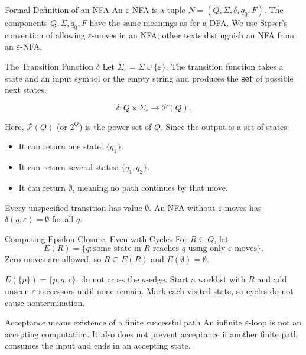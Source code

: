 \documentclass[10pt]{beamer}
\begin{document}
\begin{frame}{Formal Definition of an NFA}
  \small
  An $\varepsilon$-NFA is a tuple $N=(Q,\Sigma,\delta,q_0,F)$.
  The components $Q,\Sigma,q_0,F$ have the same meanings as for a DFA.
  We use Sipser's convention of allowing $\varepsilon$-moves in an NFA;
  other texts distinguish an NFA from an $\varepsilon$-NFA.
  \pause
  \begin{block}{The Transition Function $\delta$}
    Let $\Sigma_\varepsilon = \Sigma \cup \{\varepsilon\}$.
    The transition function takes a state and an input symbol or the empty string and produces the \textbf{set} of possible next states.
    
    \[
      \delta:Q\times\Sigma_\varepsilon\longrightarrow\mathcal{P}(Q).
    \]
  \end{block}
  \pause
  \vspace{0.3cm}
  Here, $\mathcal{P}(Q)$ (or $2^Q$) is the power set of $Q$. Since the output is a set of states:
  \begin{itemize}
      \item It can return one state: $\{q_1\}$.
      \item It can return several states: $\{q_1,q_2\}$.
      \item It can return $\emptyset$, meaning no path continues by that move.
  \end{itemize}
  Every unspecified transition has value $\emptyset$. An NFA without
  $\varepsilon$-moves has $\delta(q,\varepsilon)=\emptyset$ for all $q$.
\end{frame}

\begin{frame}{Computing Epsilon-Closure, Even with Cycles}
  \small
  For $R\subseteq Q$, let
  \[
    E(R)=\{q:\text{some state in }R\text{ reaches }q
                    \text{ using only }\varepsilon\text{-moves}\}.
  \]
  Zero moves are allowed, so $R\subseteq E(R)$ and $E(\emptyset)=\emptyset$.
  \begin{center}
  \end{center}
  \pause
  $E(\{p\})=\{p,q,r\}$; do not cross the $a$-edge.
  Start a worklist with $R$ and add unseen $\varepsilon$-successors until
  none remain. Mark each visited state, so cycles do not cause nontermination.
  \begin{block}{Acceptance means existence of a finite successful path}
    An infinite $\varepsilon$-loop is not an accepting computation. It also
    does not prevent acceptance if another finite path consumes the input
    and ends in an accepting state.
  \end{block}
\end{frame}
\end{document}
